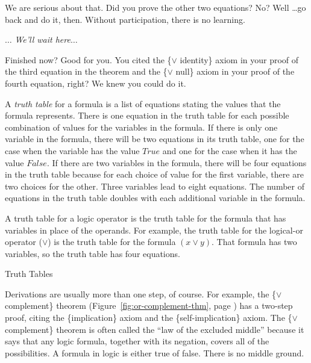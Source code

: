 We are serious about that. Did you prove the other two equations?
No? Well \dots go back and do it, then. Without participation, there
is no learning.

\smallskip
$\dots$ \emph{We'll wait here}$\dots$
\smallskip

Finished now? Good for you. You cited the \{$\vee$ identity\} axiom in your
proof of the third equation in the theorem and the \{$\vee$ null\}
axiom in your proof of the fourth equation, right? We knew you could do it.

\begin{aside}
A \emph{truth table} for a formula is a list of equations
stating the values that the formula represents.
There is one equation in the truth table for each possible
combination of values for the variables in the formula.
If there is only one variable in the formula,
there will be two equations in its truth table,
one for the case when the variable has the value
$True$ and one for the case when it has the value $False$.
If there are two variables in the formula,
there will be four equations in the truth table
because for each choice of value for the first variable,
there are two choices for the other.
Three variables lead to eight equations.
The number of equations in the truth table
doubles with each additional variable
in the formula.

A truth table for a logic operator is the truth table for the formula
that has variables in place of the operands.
For example, the truth table for the logical-or operator ($\vee$)
is the truth table for the formula $(x \vee y)$.
That formula has two variables, so the truth table has four equations.
\caption{Truth Tables}
\label{truth-tables}
\end{aside}

Derivations are usually more than one step, of course.
For example, the
\{$\vee$ complement\} theorem
(Figure~\ref{fig:or-complement-thm}, page \pageref{fig:or-complement-thm})
has a two-step proof, citing the \{implication\} axiom
and the \{self-implication\} axiom.
The \{$\vee$ complement\} theorem is often called the
``law of the excluded middle''
because it says that any logic formula,
together with its negation, covers all of the possibilities.
A formula in logic is either true of false.
There is no middle ground.

